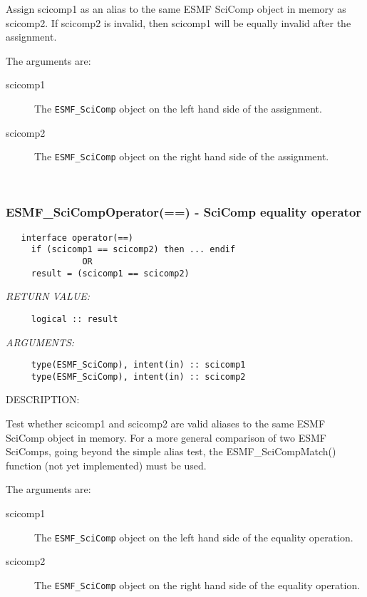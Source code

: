      Assign scicomp1 as an alias to the same ESMF SciComp object in memory
     as scicomp2. If scicomp2 is invalid, then scicomp1 will be equally 
     invalid after the assignment.
  
     The arguments are:
     \begin{description}
     \item[scicomp1]
       The {\tt ESMF\_SciComp} object on the left hand side of the assignment.
     \item[scicomp2]
       The {\tt ESMF\_SciComp} object on the right hand side of the assignment.
     \end{description}
   
 
\mbox{}\hrulefill\ 
 
\subsubsection [ESMF\_SciCompOperator(==)] {ESMF\_SciCompOperator(==) - SciComp equality operator}


  
\begin{verbatim}   interface operator(==)
     if (scicomp1 == scicomp2) then ... endif
               OR
     result = (scicomp1 == scicomp2)\end{verbatim}{\em RETURN VALUE:}
\begin{verbatim}     logical :: result\end{verbatim}{\em ARGUMENTS:}
\begin{verbatim}     type(ESMF_SciComp), intent(in) :: scicomp1
     type(ESMF_SciComp), intent(in) :: scicomp2\end{verbatim}
{\sf DESCRIPTION:\\ }


     Test whether scicomp1 and scicomp2 are valid aliases to the same ESMF
     SciComp object in memory. For a more general comparison of two ESMF 
     SciComps, going beyond the simple alias test, the ESMF\_SciCompMatch() 
     function (not yet implemented) must be used.
  
     The arguments are:
     \begin{description}
     \item[scicomp1]
       The {\tt ESMF\_SciComp} object on the left hand side of the equality
       operation.
     \item[scicomp2]
       The {\tt ESMF\_SciComp} object on the right hand side of the equality
       operation.
     \end{description}
   
